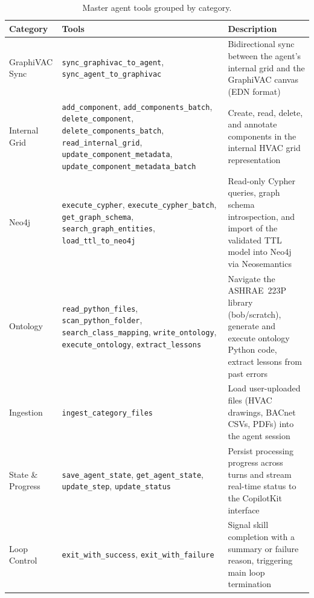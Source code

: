 \begin{table}[htbp]
  \caption{Master agent tools grouped by category.}
  \label{tab:tools}
  \centering
  \small
  \begin{tabular}{p{3.2cm}p{4.5cm}p{6.5cm}}
    \toprule
    \textbf{Category} & \textbf{Tools} & \textbf{Description} \\
    \midrule
    GraphiVAC Sync
      & \texttt{sync\_graphivac\_to\_agent},
        \texttt{sync\_agent\_to\_graphivac}
      & Bidirectional sync between the agent's internal grid and the GraphiVAC canvas (EDN format) \\
    \addlinespace
    Internal Grid
      & \texttt{add\_component},
        \texttt{add\_components\_batch},
        \texttt{delete\_component},
        \texttt{delete\_components\_batch},
        \texttt{read\_internal\_grid},
        \texttt{update\_component\_metadata},
        \texttt{update\_component\_metadata\_batch}
      & Create, read, delete, and annotate components in the internal HVAC grid representation \\
    \addlinespace
    Neo4j
      & \texttt{execute\_cypher},
        \texttt{execute\_cypher\_batch},
        \texttt{get\_graph\_schema},
        \texttt{search\_graph\_entities},
        \texttt{load\_ttl\_to\_neo4j}
      & Read-only Cypher queries, graph schema introspection, and import of the validated TTL model into Neo4j via Neosemantics \\
    \addlinespace
    Ontology
      & \texttt{read\_python\_files},
        \texttt{scan\_python\_folder},
        \texttt{search\_class\_mapping},
        \texttt{write\_ontology},
        \texttt{execute\_ontology},
        \texttt{extract\_lessons}
      & Navigate the ASHRAE~223P library (bob/scratch), generate and execute ontology Python code, extract lessons from past errors \\
    \addlinespace
    Ingestion
      & \texttt{ingest\_category\_files}
      & Load user-uploaded files (HVAC drawings, BACnet CSVs, PDFs) into the agent session \\
    \addlinespace
    State \& Progress
      & \texttt{save\_agent\_state},
        \texttt{get\_agent\_state},
        \texttt{update\_step},
        \texttt{update\_status}
      & Persist processing progress across turns and stream real-time status to the CopilotKit interface \\
    \addlinespace
    Loop Control
      & \texttt{exit\_with\_success},
        \texttt{exit\_with\_failure}
      & Signal skill completion with a summary or failure reason, triggering main loop termination \\
    \bottomrule
  \end{tabular}
\end{table}

